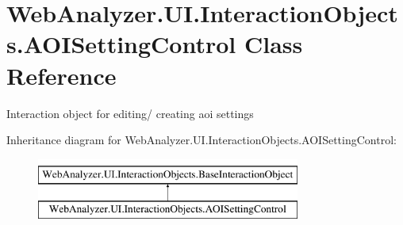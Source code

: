 \hypertarget{class_web_analyzer_1_1_u_i_1_1_interaction_objects_1_1_a_o_i_setting_control}{}\section{Web\+Analyzer.\+U\+I.\+Interaction\+Objects.\+A\+O\+I\+Setting\+Control Class Reference}
\label{class_web_analyzer_1_1_u_i_1_1_interaction_objects_1_1_a_o_i_setting_control}


Interaction object for editing/ creating aoi settings  


Inheritance diagram for Web\+Analyzer.\+U\+I.\+Interaction\+Objects.\+A\+O\+I\+Setting\+Control\+:\begin{figure}[H]
\begin{center}
\leavevmode
\includegraphics[height=2.000000cm]{class_web_analyzer_1_1_u_i_1_1_interaction_objects_1_1_a_o_i_setting_control}
\end{center}
\end{figure}
